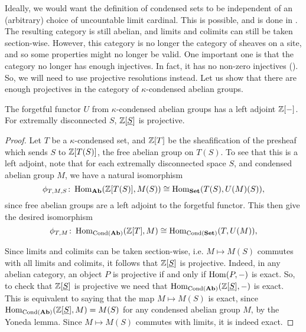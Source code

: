 \documentclass{article}
\DeclareMathOperator{\Cond}{Cond}
\begin{document}
Ideally, we would want the definition of condensed sets
to be independent of an (arbitrary) choice of uncountable
limit cardinal. This is possible, and is done
in \cite[Appendix to Lecture II]{Sch2019LecturesCM}. The resulting
category is still abelian, and limits and colimits
can still be taken section-wise. However, this category
is no longer the category of sheaves on a site, and so some
properties might no longer be valid. One important one
is that the category no longer has enough injectives. In fact,
it has no non-zero injectives (\cite{Sch2020AreTE}). So,
we will need to use projective resolutions instead.
Let us show that there are enough projectives in
the category of $\kappa$-condensed abelian groups.
\begin{lemma}
    The forgetful functor $U$ from $\kappa$-condensed
    abelian groups has a left adjoint $\mathbb{Z}[-]$.
    For extremally disconnected $S$, $\mathbb{Z}[\underline{S}]$
    is projective.
\end{lemma}
\begin{proof}
    Let $T$ be a $\kappa$-condensed set, and $\mathbb{Z}[T]$ be the sheafification of the presheaf
    which sends $S$ to $\mathbb{Z}[T(S)]$, the free abelian group on $T(S)$.
    To see that this is a left adjoint, note that for each extremally disconnected
    space $S$, and condensed abelian group $M$, we have a natural isomorphism
    \begin{equation*}
        \phi_{T, M, S}\colon \operatorname{Hom}_{\operatorname{\mathbf{Ab}}}(\mathbb{Z}[T(S)], M(S)) \cong \operatorname{Hom}_{\operatorname{\mathbf{Set}}}(T(S), U(M)(S)),
    \end{equation*}
    since free abelian groups are a left adjoint to the forgetful functor.
    This then give the desired isomorphism
    \begin{equation*}
        \phi_{T, M} \colon \Hom_{\Cond(\Ab)}(\bbZ[T], M) \cong \Hom_{\Cond(\Set)}(T, U(M)),
    \end{equation*}

    Since limits and colimits can be taken section-wise, i.e. $M \mapsto M(S)$
    commutes with all limits and colimits, it follows that $\mathbb{Z}[\underline{S}]$
    is projective. Indeed, in any abelian category, an object $P$ is
    projective if and only if $\operatorname{Hom}(P, -)$ is exact. So, to check that $\mathbb{Z}[\underline{S}]$
    is projective we need that $\Hom_{\Cond(\Ab)}(\bbZ[\underline{S}], -)$ is exact.
    This is equivalent to saying that the map $M \mapsto M(S)$
    is exact, since $\Hom_{\Cond(\Ab)}(\bbZ[\underline{S}], M) = M(S)$ for any
    condensed abelian group $M$, by the Yoneda lemma. Since $M \mapsto M(S)$
    commutes with limits, it is indeed exact.
\end{proof}
\end{document}
